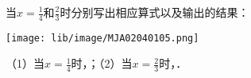 当$x=\frac{1}{4}$和$\frac{2}{3}$时分别写出相应算式以及输出的结果：
\begin{center}
	\texttt{[image: lib/image/MJA02040105.png]}
	\vspace{0.5cm}
\end{center}
（1）当$x=\frac{1}{4}$时，\key{\hspace{4em}}；（2）当$x=\frac{2}{3}$时，\key{\hspace{4em}}．